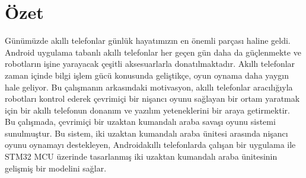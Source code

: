 \chapter*{Özet}


Günümüzde akıllı telefonlar günlük hayatımızın en önemli parçası haline geldi. Android uygulama tabanlı akıllı telefonlar her geçen gün daha da güçlenmekte ve robotların işine yarayacak çeşitli aksesuarlarla donatılmaktadır. Akıllı telefonlar zaman içinde bilgi işlem gücü konusunda geliştikçe, oyun oynama daha yaygın hale geliyor. Bu çalışmanın arkasındaki motivasyon, akıllı telefonlar aracılığıyla robotları kontrol ederek çevrimiçi bir nişancı oyunu sağlayan bir ortam yaratmak için bir akıllı telefonun donanım ve yazılım yeteneklerini bir araya getirmektir.\\

Bu çalışmada, çevrimiçi bir uzaktan kumandalı araba savaşı oyunu sistemi sunulmuştur. Bu sistem, iki uzaktan kumandalı araba ünitesi arasında nişancı oyunu oynamayı destekleyen, Android\texttrademark\;akıllı telefonlarda çalışan bir uygulama ile STM32 MCU üzerinde tasarlanmış iki uzaktan kumandalı araba ünitesinin gelişmiş bir modelini sağlar.

\vfill
\clearpage